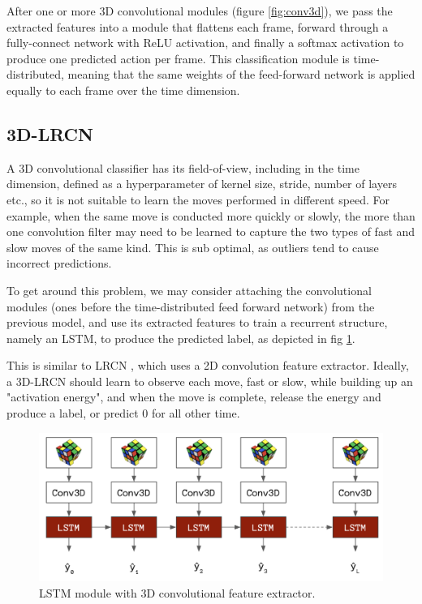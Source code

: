 \documentclass[10pt,twocolumn,letterpaper]{article}
\begin{document}
After  one or more 3D convolutional modules (figure \ref{fig:conv3d}), we pass the extracted features into a module that flattens each frame, forward through a fully-connect network with ReLU activation, and finally a softmax activation to produce one predicted action per frame. This classification module is time-distributed, meaning that the same weights of the feed-forward network is applied equally to each frame over the time dimension. 

\subsection{3D-LRCN}

A 3D convolutional classifier has its field-of-view, including in the time dimension, defined as a hyperparameter of kernel size, stride, number of layers etc., so it is not suitable to learn the moves performed in different speed. For example, when the same move is conducted more quickly or slowly, the more than one convolution filter may need to be learned to capture the two types of fast and slow moves of the same kind. This is sub optimal, as outliers tend to cause incorrect predictions. 

To get around this problem, we may consider attaching the convolutional modules (ones before the time-distributed feed forward network) from the previous model, and use its extracted features to train a recurrent structure, namely an LSTM, to produce the predicted label, as depicted in fig \ref{fig:lstm}.

This is similar to LRCN \cite{lrcn}, which uses a 2D convolution feature extractor. Ideally, a 3D-LRCN should learn to observe each move, fast or slow, while building up an "activation energy", and when the move is complete, release the energy and produce a label, or predict 0 for all other time. 

\begin{figure}[]
    \centering
    \includegraphics[scale=0.13]{lstm.png}
    \caption{LSTM module with 3D convolutional feature extractor.}
    \label{fig:lstm}
\end{figure}
\end{document}

